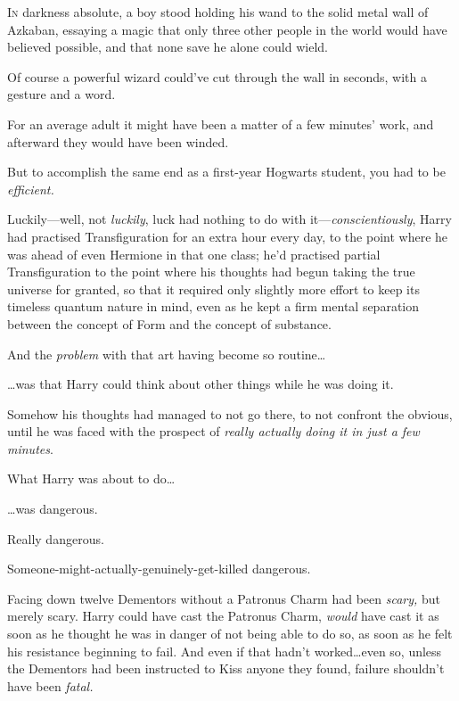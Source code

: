 

\lettrine{I}{n} darkness absolute, a boy stood holding his wand to the solid metal wall of
Azkaban, essaying a magic that only three other people in the world would have
believed possible, and that none save he alone could wield.

Of course a powerful wizard could’ve cut through the wall in seconds, with a
gesture and a word.

For an average adult it might have been a matter of a few minutes’ work, and
afterward they would have been winded.

But to accomplish the same end as a first-year Hogwarts student, you had to be
\emph{efficient.}

Luckily—well, not \emph{luckily}, luck had nothing to do with
it—\emph{conscientiously}, Harry had practised Transfiguration for an extra
hour every day, to the point where he was ahead of even Hermione in that one
class; he’d practised partial Transfiguration to the point where his thoughts
had begun taking the true universe for granted, so that it required only
slightly more effort to keep its timeless quantum nature in mind, even as he
kept a firm mental separation between the concept of Form and the concept of
substance.

And the \emph{problem} with that art having become so routine…

…was that Harry could think about other things while he was doing it.

Somehow his thoughts had managed to not go there, to not confront the obvious,
until he was faced with the prospect of \emph{really actually doing it in just
a few minutes}.

What Harry was about to do…

…was dangerous.

Really dangerous.

Someone-might-actually-genuinely-get-killed dangerous.

Facing down twelve Dementors without a Patronus Charm had been \emph{scary,}
but merely scary. Harry could have cast the Patronus Charm, \emph{would} have
cast it as soon as he thought he was in danger of not being able to do so, as
soon as he felt his resistance beginning to fail. And even if that hadn’t
worked…even so, unless the Dementors had been instructed to Kiss anyone
they found, failure shouldn’t have been \emph{fatal.}


